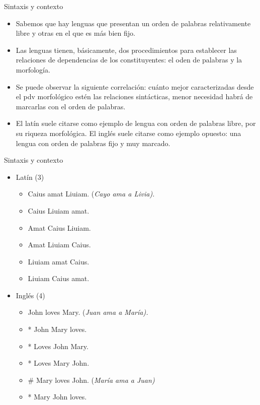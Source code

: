 \documentclass{beamer}
\begin{document}
\begin{frame}{Sintaxis y contexto}

\begin{itemize}
	\item Sabemos que hay lenguas que presentan un orden de palabras relativamente libre y otras en el que es más bien fijo.
	\item Las lenguas tienen, básicamente, dos procedimientos para establecer las relaciones de dependencias de los constituyentes: el oden de palabras y la morfología.
	\item Se puede observar la siguiente correlación: cuánto mejor caracterizadas desde el pdv morfológico estén las relaciones sintácticas, menor necesidad habrá de marcarlas con el orden de palabras.
	\item El latín suele citarse como ejemplo de lengua con orden de palabras libre, por su riqueza morfológica. El inglés suele citarse como ejemplo opuesto: una lengua con orden de palabras fijo y muy marcado. 
\end{itemize}

\end{frame}


\begin{frame}{Sintaxis y contexto}

\begin{itemize}
	\item Latín (3)
	\begin{itemize}
		\item Caius amat Liuiam. (\it{Cayo ama a Livia}).
		\item Caius Liuiam amat.
		\item Amat Caius Liuiam.
		\item Amat Liuiam Caius.
		\item Liuiam amat Caius.
		\item Liuiam Caius amat.
	\end{itemize}
	
	\item Inglés (4)
	\begin{itemize}
		\item John loves Mary. (\it{Juan ama a María}).
		\item * John Mary loves.
		\item * Loves John Mary.
		\item * Loves Mary John.
		\item \# Mary loves John. (\it{María ama a Juan})
		\item * Mary John loves.
	\end{itemize}

\end{itemize}

\end{frame}
\end{document}
